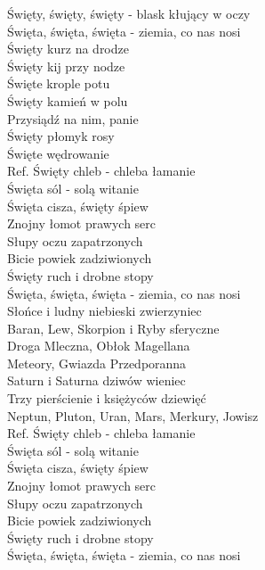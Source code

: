 
Święty, święty, święty - blask kłujący w oczy  \\
Święta, święta, święta - ziemia, co nas nosi \\
\hops
Święty kurz na drodze \\
Święty kij przy nodze \\
Święte krople potu  \\
Święty kamień w polu  \\
Przysiądź na nim, panie  \\
Święty płomyk rosy  \\
Święte wędrowanie  \\
\hops
Ref. Święty chleb - chleba łamanie \\
 Święta sól - solą witanie   \tab{}\\
 Święta cisza, święty śpiew  \\
 Znojny łomot prawych serc   \\
 Słupy oczu zapatrzonych   \tab{}\tab{} \\
 Bicie powiek zadziwionych  \tab{} \\
 Święty ruch i drobne stopy  \tab{} \\
 Święta, święta, święta - ziemia, co nas nosi  \\
\hops
Słońce i ludny niebieski zwierzyniec  \\
Baran, Lew, Skorpion i Ryby sferyczne  \\
Droga Mleczna, Obłok Magellana  \\
Meteory, Gwiazda Przedporanna   \\
Saturn i Saturna dziwów wieniec   \tab{}\\
Trzy pierścienie i księżyców dziewięć  \tab{} \\
Neptun, Pluton, Uran, Mars, Merkury, Jowisz   \tab{}\\
\hops
Ref. Święty chleb - chleba łamanie\\
 Święta sól - solą witanie \\
 Święta cisza, święty śpiew \\
 Znojny łomot prawych serc \\
 Słupy oczu zapatrzonych \\
 Bicie powiek zadziwionych \\
 Święty ruch i drobne stopy \\
 Święta, święta, święta - ziemia, co nas nosi